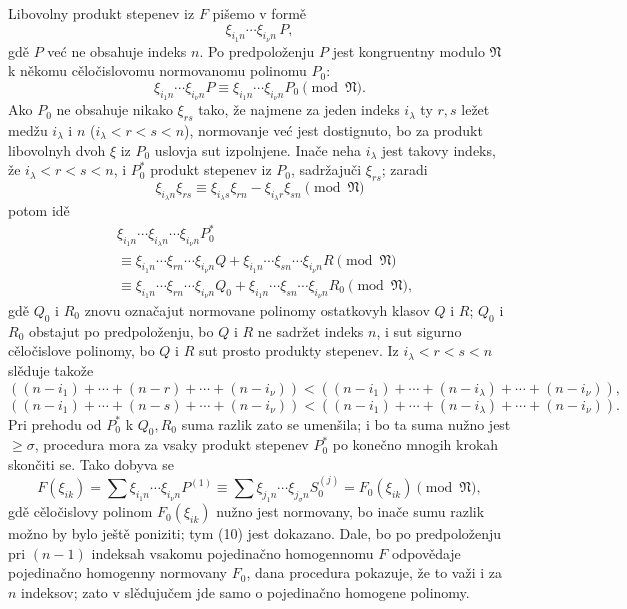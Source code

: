 \documentclass[11pt]{article}
\providecommand{\frN}{\mathfrak N}
\begin{document}
Libovolny produkt stepenev iz \(F\) pišemo v formě
\[
        \xi_{i_1n}\cdots\xi_{i_\nu n}\,P,
\]
gdě \(P\) već ne obsahuje indeks \(n\). Po predpoloženju \(P\) jest kongruentny modulo \(\frN\) k někomu cěločislovomu normovanomu polinomu \(P_0\):
\[
        \xi_{i_1n}\cdots\xi_{i_\nu n}P
        \equiv
        \xi_{i_1n}\cdots\xi_{i_\nu n}P_0
        \pmod{\frN}.
\]
Ako \(P_0\) ne obsahuje nikako \(\xi_{rs}\) tako, že najmene za jeden indeks \(i_\lambda\) ty \(r,s\) ležet medžu \(i_\lambda\) i \(n\) (\(i_\lambda<r<s<n\)), normovanje već jest dostignuto, bo za produkt libovolnyh dvoh \(\xi\) iz \(P_0\) uslovja sut izpolnjene. Inače neha \(i_\lambda\) jest takovy indeks, že \(i_\lambda<r<s<n\), i \(P_0^*\) produkt stepenev iz \(P_0\), sadržajuči \(\xi_{rs}\); zaradi
\[
        \xi_{i_\lambda n}\xi_{rs}\equiv
        \xi_{i_\lambda s}\xi_{rn}-\xi_{i_\lambda r}\xi_{sn}
        \pmod{\frN}
\]
potom idě
\begin{align*}
 &\xi_{i_1n}\cdots\xi_{i_\lambda n}\cdots\xi_{i_\nu n}P_0^*\\
 &\equiv
 \xi_{i_1n}\cdots\xi_{rn}\cdots\xi_{i_\nu n}Q
 +
 \xi_{i_1n}\cdots\xi_{sn}\cdots\xi_{i_\nu n}R
 \pmod{\frN}\\
 &\equiv
 \xi_{i_1n}\cdots\xi_{rn}\cdots\xi_{i_\nu n}Q_0
 +
 \xi_{i_1n}\cdots\xi_{sn}\cdots\xi_{i_\nu n}R_0
 \pmod{\frN},
\end{align*}
gdě \(Q_0\) i \(R_0\) znovu označajut normovane polinomy ostatkovyh klasov \(Q\) i \(R\); \(Q_0\) i \(R_0\) obstajut po predpoloženju, bo \(Q\) i \(R\) ne sadržet indeks \(n\), i sut sigurno cěločislove polinomy, bo \(Q\) i \(R\) sut prosto produkty stepenev. Iz \(i_\lambda<r<s<n\) slěduje takože
\[
 ((n-i_1)+\cdots+(n-r)+\cdots+(n-i_\nu))
 <
 ((n-i_1)+\cdots+(n-i_\lambda)+\cdots+(n-i_\nu)),
\]
\[
 ((n-i_1)+\cdots+(n-s)+\cdots+(n-i_\nu))
 <
 ((n-i_1)+\cdots+(n-i_\lambda)+\cdots+(n-i_\nu)).
\]
Pri prehodu od \(P_0^*\) k \(Q_0,R_0\) suma razlik zato se umenšila; i bo ta suma nužno jest \(\ge \sigma\), procedura mora za vsaky produkt stepenev \(P_0^*\) po konečno mnogih krokah skončiti se. Tako dobyva se
\[
        F(\xi_{ik})
        =
        \sum \xi_{i_1n}\cdots\xi_{i_\nu n}P^{(1)}
        \equiv
        \sum \xi_{j_1n}\cdots\xi_{j_\sigma n}S_0^{(j)}
        =
        F_0(\xi_{ik})\pmod{\frN},
\]
gdě cěločislovy polinom \(F_0(\xi_{ik})\) nužno jest normovany, bo inače sumu razlik možno by bylo ještě poniziti; tym (10) jest dokazano. Dale, bo po predpoloženju pri \((n-1)\) indeksah vsakomu pojedinačno homogennomu \(F\) odpovědaje pojedinačno homogenny normovany \(F_0\), dana procedura pokazuje, že to važi i za \(n\) indeksov; zato v slědujučem jde samo o pojedinačno homogene polinomy.
\end{document}
